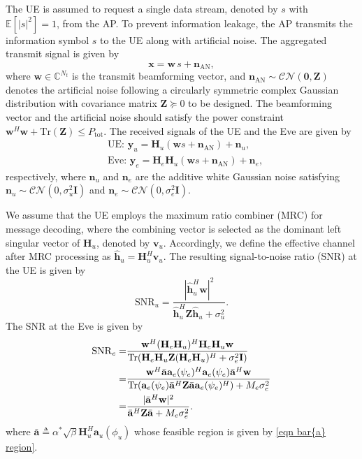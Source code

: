 \documentclass[journal]{IEEEtran}
\begin{document}
The UE is assumed to request a single data stream, denoted by $s$ with $\mathbb{E}[|s|^2] = 1$, from the AP. To prevent information leakage, the AP transmits the information symbol $s$ to the UE along with artificial noise. The aggregated transmit signal is given by
\begin{equation}
\mathbf{x} = \mathbf{w}\, s + \mathbf{n}_{\mathrm{AN}}, \label{eq:tx_signal}
\end{equation}
where $\mathbf{w} \in \mathbb{C}^{N_t}$ is the transmit beamforming vector, and $\mathbf{n}_{\mathrm{AN}} \sim \mathcal{CN}(\mathbf{0}, \mathbf{Z})$ denotes the artificial noise following a circularly symmetric complex Gaussian distribution with covariance matrix $\mathbf{Z} \succeq 0$ to be designed. The beamforming vector and the artificial noise should satisfy the power constraint $\mathbf{w}^H\mathbf{w}+\mathrm{Tr}(\mathbf{Z})\le P_{\mathrm{tot}}$. The received signals of the UE and the Eve are given by
\begin{subequations}\begin{align}
&\textrm{UE: }\mathbf{y}_u = \mathbf{H}_{u} ( \mathbf{w} s + \mathbf{n}_{\mathrm{AN}} ) + \mathbf{n}_u,\label{eq:UE_obs}\\
&\textrm{Eve: } \mathbf{y}_e = \mathbf{H}_e \mathbf{H}_u (\mathbf{w} s + \mathbf{n}_{\mathrm{AN}} ) + \mathbf{n}_e, \label{eq:eve_obs}
\end{align}\end{subequations}
respectively, where $\mathbf{n}_u$ and $\mathbf{n}_e$ are the additive white Gaussian noise satisfying $\mathbf{n}_u\sim \mathcal{CN}(0,\sigma_u^2\mathbf{I})$ and $\mathbf{n}_e\sim \mathcal{CN}(0,\sigma_e^2\mathbf{I})$.

We assume that the UE employs the maximum ratio combiner (MRC) for message decoding, where the combining vector is selected as the dominant left singular vector of $\mathbf{H}_u$, denoted by $\mathbf{v}_u$. Accordingly, we define the effective channel after MRC processing as $\hat{\mathbf{h}}_u = \mathbf{H}_u^H \mathbf{v}_u$. The resulting signal-to-noise ratio (SNR) at the UE is given by
\begin{equation}
\mathrm{SNR}_u = \frac{|\hat{\mathbf{h}}_u^H \mathbf{w}|^2}{\hat{\mathbf{h}}_u^H \mathbf{Z} \hat{\mathbf{h}}_u + \sigma_u^2}. \label{eq:snr_u}
\end{equation}
The SNR at the Eve is given by
\begin{align}
\mathrm{SNR}_e =& \frac{ \mathbf{w}^H (\mathbf{H}_e \mathbf{H}_u)^H\mathbf{H}_e \mathbf{H}_u \mathbf{w}}{\mathrm{Tr}(\mathbf{H}_e \mathbf{H}_u \mathbf{Z} (\mathbf{H}_e \mathbf{H}_u)^H + \sigma_e^2\mathbf{I})}\notag\\
=& \frac{ \mathbf{w}^H \bar{\mathbf{a}} \mathbf{a}_e(\psi_e)^H \mathbf{a}_e(\psi_e)\bar{\mathbf{a}}^H \mathbf{w}}{\mathrm{Tr}(\mathbf{a}_e(\psi_e)\bar{\mathbf{a}}^H \mathbf{Z} \bar{\mathbf{a}} \mathbf{a}_e(\psi_e)^H) + M_e \sigma_e^2}\notag\\
=& \frac{|\bar{\mathbf{a}}^H \mathbf{w}|^2}{\bar{\mathbf{a}}^H \mathbf{Z} \bar{\mathbf{a}} + M_e \sigma_e^2}.\notag
\end{align}
where $\bar{\mathbf{a}}\triangleq {\alpha}^*\sqrt{\beta} \mathbf{H}_u^H \mathbf{a}_u(\phi_u)$ whose feasible region is given by \eqref{eqn bar{a} region}.
\end{document}
